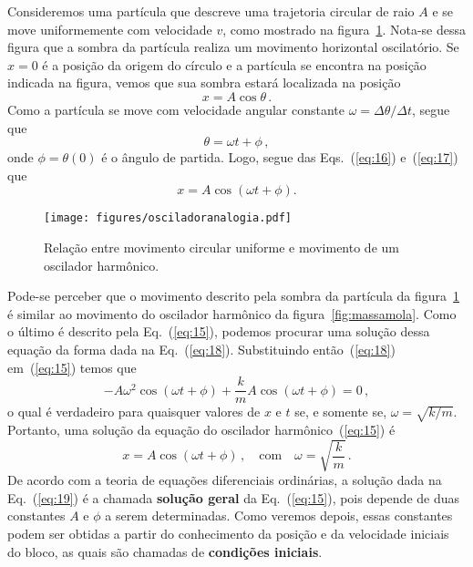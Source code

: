 \documentclass[12pt,a4paper]{article}
\theoremstyle{definition}
\begin{document}
Consideremos uma partícula que descreve uma trajetoria circular de
raio $A$ e se move uniformemente com velocidade $v$, como mostrado na
figura~\ref{fig:ociladoranalogia}. Nota-se dessa figura que a sombra
da partícula realiza um movimento horizontal oscilatório. Se $x=0$ é a
posição da origem do círculo e a partícula se encontra na posição
indicada na figura, vemos que sua sombra estará localizada na posição
\begin{equation}
  \label{eq:16}
  x=A\cos\theta\,.
\end{equation}
Como a partícula se move com velocidade angular constante
$\omega=\Delta\theta/\Delta t$, segue que
\begin{equation}
  \label{eq:17}
  \theta=\omega t+\phi\,,
\end{equation}
onde $\phi=\theta(0)$ é o ângulo de partida. Logo, segue das
Eqs.~(\ref{eq:16}) e~(\ref{eq:17}) que
\begin{equation}
  \label{eq:18}
  x=A\cos(\omega t+\phi).
\end{equation}

\begin{figure}[ht]
  \centering
  \texttt{[image: figures/osciladoranalogia.pdf]}
  \caption{Relação entre movimento circular uniforme e movimento de um
    oscilador harmônico.}
  \label{fig:ociladoranalogia}
\end{figure}

Pode-se perceber que o movimento descrito pela sombra da partícula da
figura~\ref{fig:ociladoranalogia} é similar ao movimento do oscilador
harmônico da figura~\ref{fig:massamola}. Como o último é descrito pela
Eq.~(\ref{eq:15}), podemos procurar uma solução dessa equação da forma
dada na Eq.~(\ref{eq:18}). Substituindo então~(\ref{eq:18})
em~(\ref{eq:15}) temos que
$$-A\omega^2\cos(\omega t+\phi)+\frac{k}{m}A\cos(\omega t+\phi)=0\,,$$
o qual é verdadeiro para quaisquer valores de $x$ e $t$ se, e somente
se, $\omega=\sqrt{k/m}$. Portanto, uma solução da equação do oscilador
harmônico~(\ref{eq:15}) é
\begin{equation}
  \label{eq:19}
  x=A\cos(\omega t+\phi)\,,\quad \text{com}\quad \omega=\sqrt{\frac{k}{m}}\,.
\end{equation}
De acordo com a teoria de equações diferenciais ordinárias, a solução
dada na Eq.~(\ref{eq:19}) é a chamada \textbf{solução geral} da
Eq.~(\ref{eq:15}), pois depende de duas constantes $A$ e $\phi$ a
serem determinadas. Como veremos depois, essas constantes podem ser
obtidas a partir do conhecimento da posição e da velocidade iniciais
do bloco, as quais são chamadas de \textbf{condições iniciais}.
\end{document}
